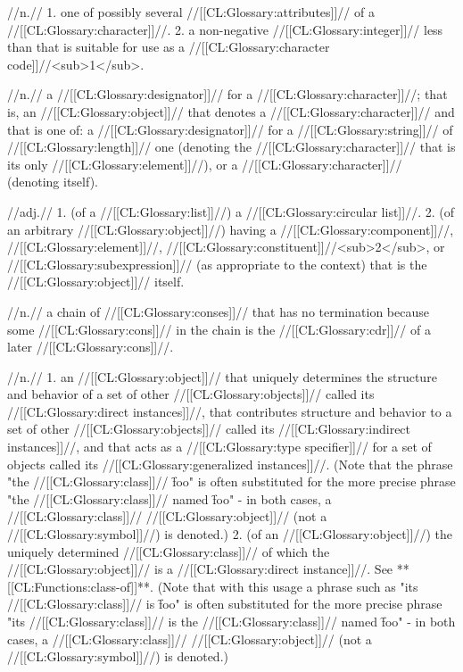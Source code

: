  //n.// 1. one of possibly several //[[CL:Glossary:attributes]]// of a //[[CL:Glossary:character]]//. 2. a non-negative //[[CL:Glossary:integer]]// less than  that is suitable for use as a //[[CL:Glossary:character code]]//<sub>1</sub>.

 //n.// a //[[CL:Glossary:designator]]// for a //[[CL:Glossary:character]]//; that is, an //[[CL:Glossary:object]]// that denotes a //[[CL:Glossary:character]]// and that is one of: a //[[CL:Glossary:designator]]// for a //[[CL:Glossary:string]]// of //[[CL:Glossary:length]]// one (denoting the //[[CL:Glossary:character]]// that is its only //[[CL:Glossary:element]]//),
 or a //[[CL:Glossary:character]]// (denoting itself).

 //adj.// 1. (of a //[[CL:Glossary:list]]//) a //[[CL:Glossary:circular list]]//. 2. (of an arbitrary //[[CL:Glossary:object]]//) having a //[[CL:Glossary:component]]//, //[[CL:Glossary:element]]//, //[[CL:Glossary:constituent]]//<sub>2</sub>, or //[[CL:Glossary:subexpression]]// (as appropriate to the context) that is the //[[CL:Glossary:object]]// itself.

 //n.// a chain of //[[CL:Glossary:conses]]// that has no termination because some
 //[[CL:Glossary:cons]]// in the chain is the //[[CL:Glossary:cdr]]// of a later //[[CL:Glossary:cons]]//.

 //n.// 1. an //[[CL:Glossary:object]]// that uniquely determines the structure and behavior of a set of other //[[CL:Glossary:objects]]// called its //[[CL:Glossary:direct instances]]//, that contributes structure and behavior to a set of other //[[CL:Glossary:objects]]// called its //[[CL:Glossary:indirect instances]]//, and that acts as a //[[CL:Glossary:type specifier]]// for a set of objects called its //[[CL:Glossary:generalized instances]]//.  (Note that the phrase "the //[[CL:Glossary:class]]// \f{foo}" is often substituted for the more precise phrase "the //[[CL:Glossary:class]]// named \f{foo}" - in both cases, a //[[CL:Glossary:class]]// //[[CL:Glossary:object]]// (not a //[[CL:Glossary:symbol]]//) is denoted.) 2. (of an //[[CL:Glossary:object]]//) the uniquely determined //[[CL:Glossary:class]]// of which the //[[CL:Glossary:object]]// is a //[[CL:Glossary:direct instance]]//. See **[[CL:Functions:class-of]]**.  (Note that with this usage a phrase such as "its //[[CL:Glossary:class]]// is \f{foo}" is often substituted for the more precise phrase "its //[[CL:Glossary:class]]// is the //[[CL:Glossary:class]]// named \f{foo}" - in both cases, a //[[CL:Glossary:class]]// //[[CL:Glossary:object]]// (not a //[[CL:Glossary:symbol]]//) is denoted.)

